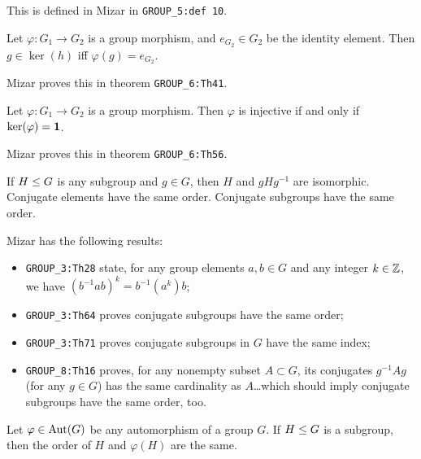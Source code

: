 \begin{remark}
This is defined in Mizar in \verb#GROUP_5:def 10#.
\end{remark}

\begin{theorem}
  Let $\varphi\colon G_{1}\to G_{2}$ is a group morphism, and
  $e_{G_{2}}\in G_{2}$ be the identity element.
  Then $g\in\ker(h)$ iff $\varphi(g)=e_{G_{2}}$.
\end{theorem}

\begin{remark}
Mizar proves this in theorem \verb#GROUP_6:Th41#.
\end{remark}

\begin{theorem}
  Let $\varphi\colon G_{1}\to G_{2}$ is a group morphism.
  Then $\varphi$ is injective if and only if $\ker(\varphi)=\mathbf{1}$.
\end{theorem}

\begin{remark}
Mizar proves this in theorem \verb#GROUP_6:Th56#.
\end{remark}

\begin{theorem}
  If $H\leq G$ is any subgroup and $g\in G$, then
  $H$ and $gHg^{-1}$ are isomorphic. Conjugate elements have the same
  order. Conjugate subgroups have the same order.
\end{theorem}

\begin{remark}
Mizar has the following results:
\begin{itemize}
\item \verb#GROUP_3:Th28# state, for any group elements $a,b\in G$ and
  any integer $k\in\mathbb{Z}$, we have $(b^{-1}ab)^{k} = b^{-1}(a^{k})b$;
\item \verb#GROUP_3:Th64# proves conjugate subgroups have the same order;
\item \verb#GROUP_3:Th71# proves conjugate subgroups in $G$ have the
  same index;
\item \verb#GROUP_8:Th16# proves, for any nonempty subset $A\subset G$,
  its conjugates $g^{-1}Ag$ (for any $g\in G$) has the same cardinality
  as $A$\dots which should imply conjugate subgroups have the same
  order, too.
\end{itemize}
\end{remark}

\begin{theorem}\label{thm:pure-math:iso-subgroups-have-same-order}
  Let $\varphi\in\operatorname{Aut}(G)$ be any automorphism of a group $G$.
  If $H\leq G$ is a subgroup, then the order of $H$ and
  $\varphi(H)$ are the same.
\end{theorem}

